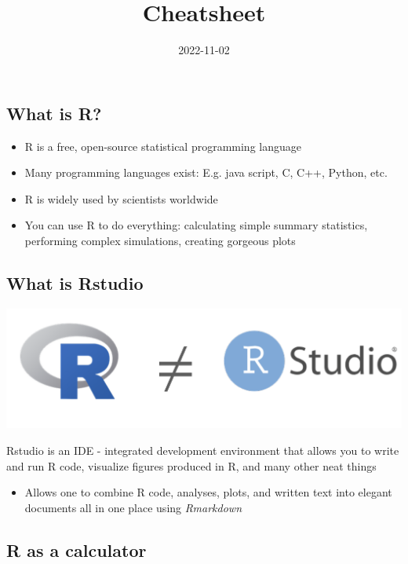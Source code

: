 \documentclass[
]{article}
\title{Cheatsheet}
\author{}
\date{\vspace{-2.5em}2022-11-02}
\providecommand{\tightlist}{%
  \setlength{\itemsep}{0pt}\setlength{\parskip}{0pt}}
\begin{document}
\maketitle

\hypertarget{what-is-r}{%
\subsection{What is R?}\label{what-is-r}}

\begin{itemize}
\tightlist
\item
  R is a free, open-source statistical programming language
\item
  Many programming languages exist: E.g. java script, C, C++, Python,
  etc.
\item
  R is widely used by scientists worldwide
\item
  You can use R to do everything: calculating simple summary statistics,
  performing complex simulations, creating gorgeous plots
\end{itemize}

\hypertarget{what-is-rstudio}{%
\subsection{What is Rstudio}\label{what-is-rstudio}}

\includegraphics{images/Screen Shot 2022-10-19 at 12.45.58 PM.png}

Rstudio is an IDE - integrated development environment that allows you
to write and run R code, visualize figures produced in R, and many other
neat things

\begin{itemize}
\tightlist
\item
  Allows one to combine R code, analyses, plots, and written text into
  elegant documents all in one place using \emph{Rmarkdown}
\end{itemize}

\hypertarget{r-as-a-calculator}{%
\subsection{R as a calculator}\label{r-as-a-calculator}}
\end{document}
